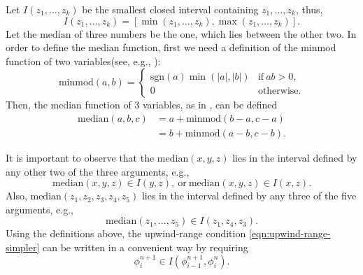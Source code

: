 \documentclass[../thesis.tex]{subfiles}
\begin{document}
Let \(I(z_{1}, \dots, z_{k})\) be the smallest closed interval containing \(z_{1}, \dots, z_{k}\),
thus,
\begin{equation}
    I(z_{1}, \dots, z_{k})
    = \left[\min(z_{1}, \dots, z_{k}),
    \max(z_{1}, \dots, z_{k})\right].
\end{equation}
Let the \(\mbox{median}\) of three numbers be the one, which lies between the other two.
In order to define the median function, first we need a definition of the minmod function of two variables(see, e.g., \cite{1993_Huynh}):
\begin{equation}
    \mbox{minmod}(a,b) =
    \begin{cases}
        \mbox{sgn}(a) \min(|a|,|b|) & \text{if}\ ab > 0, \\
        0 & \text{otherwise}.
    \end{cases}
\end{equation}
Then, the median function of 3 variables, as in \cite{1989_Huynh_CONF,1993_Huynh}, can be defined
\begin{equation}
    \begin{split}
        \mbox{median}(a,b,c)
        &= a + \mbox{minmod}\left( b - a, c - a \right)
        \\
        &= b + \mbox{minmod}\left( a - b, c - b \right).
    \end{split}
\end{equation}

It is important to observe that the \(\mbox{median}(x,y,z)\) lies in the interval defined by any other two of the three arguments, e.g.,
\begin{equation}
    \mbox{median}(x,y,z) \in I(y,z),\ \text{or}\
    \mbox{median}(x,y,z) \in I(x,z).
\end{equation}
Also, \(\mbox{median}(z_{1}, z_{2},z_{3}, z_{4},z_{5})\) lies in the interval defined by any three of the five arguments, e.g.,
\begin{equation}
    \mbox{median}(z_{1},\dots,z_{5}) \in I(z_{1},z_{4}, z_{3}).
\end{equation}
Using the definitions above, the upwind-range condition \eqref{eqn:upwind-range-simpler} can be written in a convenient way by requiring
\begin{equation}
    \phi_{i}^{n+1}\in I(\phi_{i-1}^{n+1}, \phi_{i}^{n}).
\end{equation}
\end{document}
